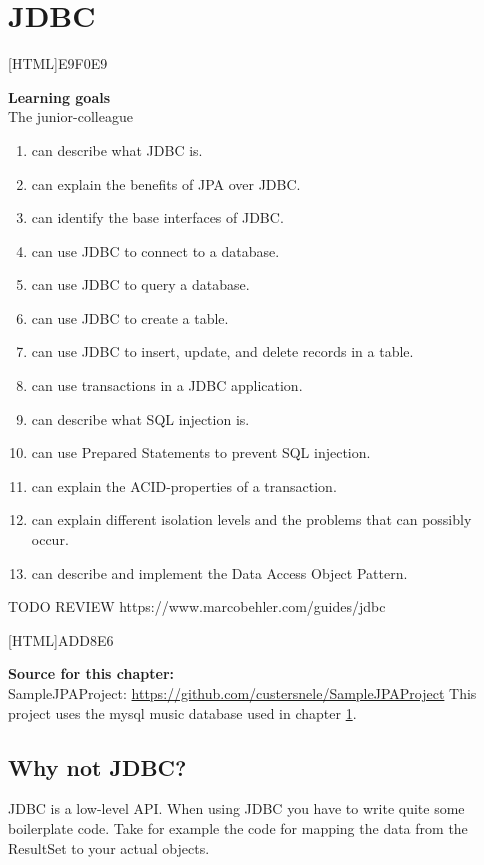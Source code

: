 \chapter{JDBC}
\label{chap:jdbc}

[HTML]{E9F0E9}{\parbox{\textwidth}{%
\noindent \textbf{Learning goals}\\
The junior-colleague
\begin{enumerate}[nolistsep]
\item can describe what JDBC is.
\item can explain the benefits of JPA over JDBC.
\item can identify the base interfaces of JDBC.
\item can use JDBC to connect to a database.
\item can use JDBC to query a database.
\item can use JDBC to create a table.
\item can use JDBC to insert, update, and delete records in a table.
\item can use transactions in a JDBC application.
\item can describe what SQL injection is.
\item can use Prepared Statements to prevent SQL injection.
\item can explain the ACID-properties of a transaction.
\item can explain different isolation levels and the problems that can possibly occur.
\item can describe and implement the Data Access Object Pattern.
\end{enumerate}}}

TODO REVIEW https://www.marcobehler.com/guides/jdbc

[HTML]{ADD8E6}{\parbox{\textwidth}{%
\noindent \textbf{Source for this chapter:}\\
SampleJPAProject: \url{https://github.com/custersnele/SampleJPAProject}
This project uses the mysql music database used in chapter \ref{chap:jdbc}. 
}}

\section{Why not JDBC?}

JDBC is a low-level API. When using JDBC you have to write quite some boilerplate code.
Take for example the code for mapping the data from the ResultSet to your actual objects.

